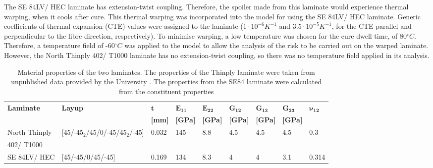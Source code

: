 \documentclass{IEEEtran}
\begin{document}
    The SE 84LV/ HEC laminate has extension-twist coupling. Therefore, the spoiler made from this laminate would experience thermal warping, when it cools after cure. This thermal warping was incorporated into the model for using the SE 84LV/ HEC laminate. Generic coefficients of thermal expansion (CTE) values were assigned to the laminate ($1\cdot10^{-6}K^{-1}$ and $3.5\cdot10^{-5}K^{-1}$, for the CTE parallel and perpendicular to the fibre direction, respectively). To minimise warping, a low temperature was chosen for the cure dwell time, of 80\;$^\circ C$. Therefore, a temperature field of -60\;$^\circ C$ was applied to the model to allow the analysis of the risk to be carried out on the warped laminate. However, the North Thinply 402/ T1000 laminate has no extension-twist coupling, so there was no temperature field applied in its analysis. 


    \begin{table}[]
    \centering
    \small
     \caption{ Material properties of the two laminates. The properties of the Thinply laminate were taken from unpublished data provided by the University \cite{DBTmaterials}. The properties from the SE84 laminate were calculated from the constituent properties \cite{se84} }
     \label{tab:ModelProp}
    \begin{tabular}{|l|l|l|l|l|l|l|l|l|}
    \hline
    \textbf{Laminate}   &  \textbf{Layup}   & $\mathbf{t}$ & $\mathbf{E_{11}}$ & $\mathbf{E_{22}}$ & $\mathbf{G_{12}}$ & $\mathbf{G_{13}}$ & $\mathbf{G_{23}}$ & $\mathbf{\boldsymbol{\nu}_{12}}$ \\ 
    && \textbf{{[}mm{]}} & \textbf{{[}GPa{]}} & \textbf{{[}GPa{]}} & \textbf{{[}GPa{]}} & \textbf{{[}GPa{]}} & \textbf{{[}GPa{]}} &  \\ 
    \hline
    North Thinply  & [45/-45$_{2}$/45/0/-45/45$_{2}$/-45] & 0.032               & 145                   & 8.8                   & 4.5                    & 4.5                    & 4.5                    & 0.3          \\ 
     402/ T1000 &&                &                    &                   &                  &                    &                   &          \\ 
    \hline
    SE 84LV/ HEC            & [45/-45/0/45/-45] & 0.169               & 134                   & 8.3                   & 4                      & 4                      & 3.1                    & 0.314        \\ \hline
    \end{tabular}
    \end{table}
    \normalfont
\end{document}
